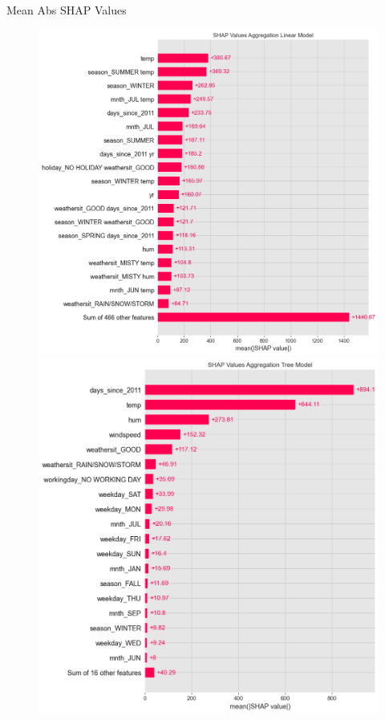 \documentclass[10pt]{beamer}
\begin{document}
\begin{frame}{Mean Abs SHAP Values}
\begin{center}
  \begin{figure}
    \includegraphics[scale=0.21]{images/interpretable_ml_124_0.png}
    \includegraphics[scale=0.21]{images/interpretable_ml_138_0.png}
  \end{figure}
\end{center}
\end{frame}
\end{document}
